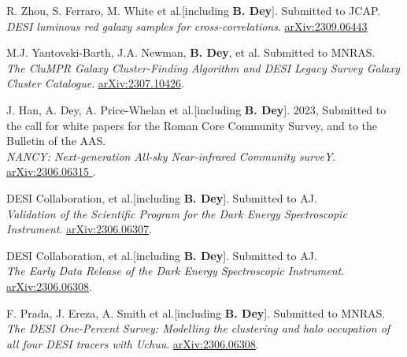  
 
\clearpage
 \begin{etaremune}[leftmargin=40pt,labelsep=10pt]
 \item R. Zhou, S. Ferraro, M. White et al.[including \textbf{B. Dey}]. Submitted to JCAP.\\ \textrm{\textit{DESI luminous red galaxy samples for cross-correlations}}. \href{https://arxiv.org/abs/2309.06443}{arXiv:2309.06443}
 
 \item M.J. Yantovski-Barth, J.A. Newman, \textbf{B. Dey}, et al. Submitted to MNRAS.\\ \textrm{\textit{The CluMPR Galaxy Cluster-Finding Algorithm and DESI Legacy Survey Galaxy Cluster Catalogue}}. \href{https://arxiv.org/abs/2307.10426}{arXiv:2307.10426}.
 
 \item J. Han, A. Dey, A. Price-Whelan et al.[including \textbf{B. Dey}]. 2023, Submitted to the call for white papers for the Roman Core Community Survey, and to the Bulletin of the AAS. \\ \textrm{\textit{NANCY: Next-generation All-sky Near-infrared Community surveY}}. \href{https://arxiv.org/abs/2306.06315}{arXiv:2306.06315 }.

 \item DESI Collaboration, et al.[including \textbf{B. Dey}]. Submitted to AJ.\\ \textrm{\textit{Validation of the Scientific Program for the Dark Energy Spectroscopic Instrument}}. \href{https://arxiv.org/abs/2306.06307}{arXiv:2306.06307}.
 
  \item DESI Collaboration, et al.[including \textbf{B. Dey}]. Submitted to AJ.\\ \textrm{\textit{The Early Data Release of the Dark Energy Spectroscopic Instrument}}. \href{https://arxiv.org/abs/2306.06308}{arXiv:2306.06308}.

 \item F. Prada, J. Ereza, A. Smith et al.[including \textbf{B. Dey}]. Submitted to MNRAS.
 \\ \textrm{\textit{The DESI One-Percent Survey: Modelling the clustering and halo occupation of all four DESI tracers with Uchuu}}. \href{https://arxiv.org/abs/2306.06308}{arXiv:2306.06308}.
 

\end{etaremune}
